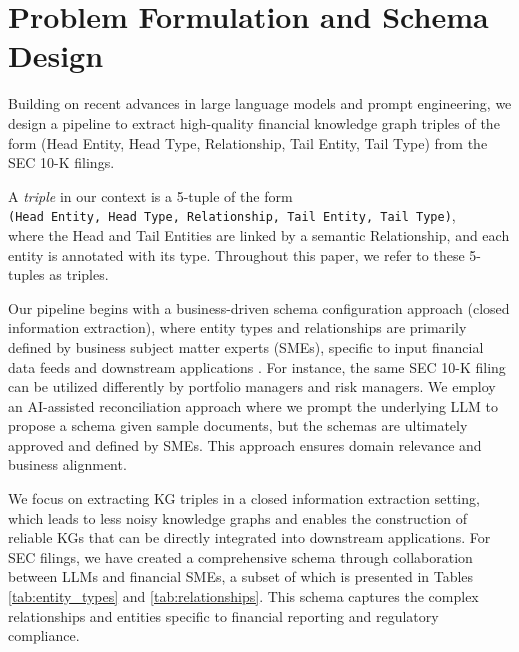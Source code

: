 \section{Problem Formulation and Schema Design}
Building on recent advances in large language models and prompt engineering, we design a pipeline to extract high-quality financial knowledge graph triples of the form (Head Entity, Head Type, Relationship, Tail Entity, Tail Type) from the SEC 10-K filings. 


\begin{definition}
A \emph{triple} in our context is a 5-tuple of the form\\
\noindent\hspace*{1em}%
\texttt{(Head Entity,\ Head Type,\ Relationship,\ Tail Entity,\ Tail Type)},\\
where the Head and Tail Entities are linked by a semantic Relationship, and each entity is annotated with its type. Throughout this paper, we refer to these 5-tuples as triples.
\end{definition}

Our pipeline begins with a business-driven schema configuration approach (closed information extraction), where entity types and relationships are primarily defined by business subject matter experts (SMEs), specific to input financial data feeds and downstream applications \cite{kertkeidkachorn2023finkg, li2024findkg}. For instance, the same SEC 10-K filing can be utilized differently by portfolio managers and risk managers. We employ an AI-assisted reconciliation approach where we prompt the underlying LLM to propose a schema given sample documents, but the schemas are ultimately approved and defined by SMEs. This approach ensures domain relevance and business alignment.

We focus on extracting KG triples in a closed information extraction setting, which leads to less noisy knowledge graphs and enables the construction of reliable KGs that can be directly integrated into downstream applications. For SEC filings, we have created a comprehensive schema through collaboration between LLMs and financial SMEs, a subset of which is presented in Tables \ref{tab:entity_types} and \ref{tab:relationships}. This schema captures the complex relationships and entities specific to financial reporting and regulatory compliance.

